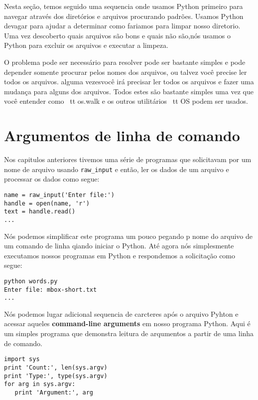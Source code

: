 Nesta seção, temos seguido uma sequencia onde usamos Python primeiro para navegar através dos diretórios e arquivos
procurando padrões. Usamos Python devagar para ajudar a determinar como fariamos para limpar nosso diretorio.
Uma vez descoberto quais arquivos são bons e quais não são,nós usamos o Python para excluir os arquivos e executar a limpeza.

O problema pode ser necessário para resolver pode ser bastante simples 
e pode depender somente procurar pelos nomes dos arquivos,
ou talvez você precise ler todos os arquivos. alguma vezesvocê irá precisar ler todos os arquivos e fazer uma 
mudança para alguns dos arquivos.
Todos estes são bastante simples uma vez que você entender como {\ tt os.walk}
e os outros utilitários {\ tt OS} podem ser usados.

\section{Argumentos de linha de comando}


Nos capitulos anteriores tivemos uma série de programas que solicitavam
por um nome de arquivo usando \verb"raw_input" e então, ler os dados 
de um arquivo e processar os dados como segue:

\begin{verbatim}
name = raw_input('Enter file:')
handle = open(name, 'r')
text = handle.read()
...
\end{verbatim}

%

Nós podemos simplificar este programa um pouco pegando p nome do arquivo
de um comando de linha qiando iniciar o Python. Até agora 
nós simplesmente executamos nossos programas em Python e respondemos a
solicitação como segue:

\begin{verbatim}
python words.py
Enter file: mbox-short.txt
...
\end{verbatim}

%

Nós podemos lugar adicional sequencia de carcteres após o arquivo Pyhton e acessar aqueles 
{\bf command-line arguments} em nosso programa Python. 
Aqui é um simples programa que demonstra leitura de arqumentos a partir de uma linha de comando.

\begin{verbatim}
import sys
print 'Count:', len(sys.argv)
print 'Type:', type(sys.argv)
for arg in sys.argv:
   print 'Argument:', arg
\end{verbatim}

